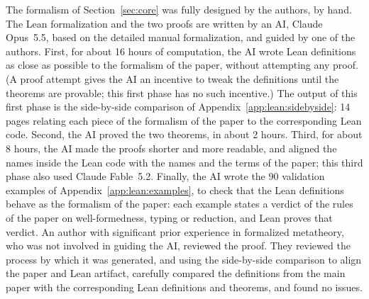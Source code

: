 The formalism of Section~\ref{sec:core} was fully designed by the authors, by hand.
The Lean formalization and the two proofs are written by an AI, Claude Opus~5.5, based on the detailed manual formalization, and guided by one of the authors.
First, for about 16 hours of computation, the AI wrote Lean definitions as close as possible to the formalism of the paper, without attempting any proof.
(A proof attempt gives the AI an incentive to tweak the definitions until the theorems are provable; this first phase has no such incentive.)
The output of this first phase is the side-by-side comparison of Appendix~\ref{app:lean:sidebyside}: 14 pages relating each piece of the formalism of the paper to the corresponding Lean code.
Second, the AI proved the two theorems, in about 2 hours.
Third, for about 8 hours, the AI made the proofs shorter and more readable, and aligned the names inside the Lean code with the names and the terms of the paper; this third phase also used Claude Fable~5.2.
Finally, the AI wrote the 90 validation examples of Appendix~\ref{app:lean:examples}, to check that the Lean definitions behave as the formalism of the paper:
each example states a verdict of the rules of the paper on well-formedness, typing or reduction, and Lean proves that verdict.
An author with significant prior experience in formalized metatheory, who was not involved in guiding the AI, reviewed the proof. They reviewed the process by which it was generated, and using the side-by-side comparison to align the paper and Lean artifact, carefully compared the definitions from the main paper with the corresponding Lean definitions and theorems, and found no issues.
